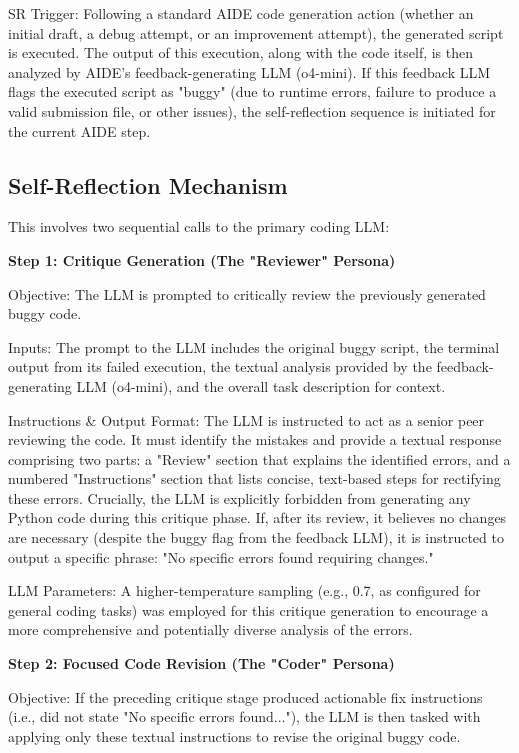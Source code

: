 SR Trigger: Following a standard AIDE code generation action (whether an initial draft, a debug attempt, or an improvement attempt), the generated script is executed. The output of this execution, along with the code itself, is then analyzed by AIDE's feedback-generating LLM (o4-mini). If this feedback LLM flags the executed script as "buggy" (due to runtime errors, failure to produce a valid submission file, or other issues), the self-reflection sequence is initiated for the current AIDE step.

\subsection{Self-Reflection Mechanism}

This involves two sequential calls to the primary coding LLM:

\textbf{Step 1: Critique Generation (The "Reviewer" Persona)}

Objective: The LLM is prompted to critically review the previously generated buggy code.

Inputs: The prompt to the LLM includes the original buggy script, the terminal output from its failed execution, the textual analysis provided by the feedback-generating LLM (o4-mini), and the overall task description for context.

Instructions \& Output Format: The LLM is instructed to act as a senior peer reviewing the code. It must identify the mistakes and provide a textual response comprising two parts: a "Review" section that explains the identified errors, and a numbered "Instructions" section that lists concise, text-based steps for rectifying these errors. Crucially, the LLM is explicitly forbidden from generating any Python code during this critique phase. If, after its review, it believes no changes are necessary (despite the buggy flag from the feedback LLM), it is instructed to output a specific phrase: "No specific errors found requiring changes."

LLM Parameters: A higher-temperature sampling (e.g., 0.7, as configured for general coding tasks) was employed for this critique generation to encourage a more comprehensive and potentially diverse analysis of the errors.

\textbf{Step 2: Focused Code Revision (The "Coder" Persona)}

Objective: If the preceding critique stage produced actionable fix instructions (i.e., did not state "No specific errors found..."), the LLM is then tasked with applying only these textual instructions to revise the original buggy code.

